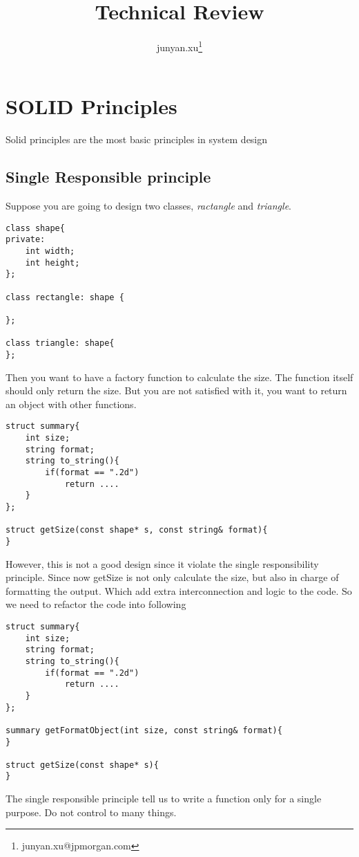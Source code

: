 \documentclass[11pt, oneside]{article}   	%
\title{Technical Review}
\author{junyan.xu\footnote{junyan.xu@jpmorgan.com}}
\begin{document}
\maketitle

\tableofcontents

\newpage

\section{SOLID Principles}
Solid principles are the most basic principles in system design

\subsection{Single Responsible principle}
Suppose you are going to design two classes, \textit{ractangle} and \textit{triangle}.

\begin{lstlisting}
class shape{
private:
	int width;
	int height;
};

class rectangle: shape {

};

class triangle: shape{
};
\end{lstlisting}

Then you want to have a factory function to calculate the size. The function itself should only return the size. But you are not satisfied with it, you want to return an object with other functions.
\begin{lstlisting}
struct summary{
	int size;
	string format;
	string to_string(){
		if(format == ".2d")
			return ....
	}
};

struct getSize(const shape* s, const string& format){
}
\end{lstlisting}

However, this is not a good design since it violate the single responsibility principle. Since now getSize is not only calculate the size, but also in charge of formatting the output.
Which add extra interconnection and logic to the code. So we need to refactor the code into following
\begin{lstlisting}
struct summary{
	int size;
	string format;
	string to_string(){
		if(format == ".2d")
			return ....
	}
};

summary getFormatObject(int size, const string& format){
}

struct getSize(const shape* s){
}
\end{lstlisting}
The single responsible principle tell us to write a function only for a single purpose. Do not control to many things.
\end{document}
